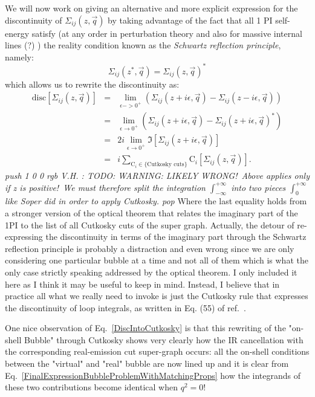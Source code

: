 \documentclass[11pt]{article}
\def\cmtVH#1{\emph{\pdfcolorstack\MyArticleWithColor push {1 0 0 rgb} V.H. : #1 \pdfcolorstack\MyArticleWithColor pop}}
\begin{document}
We will now work on giving an alternative and more explicit expression for the discontinuity of $\Sigma_{ij}(z, \vec{q})$ by taking advantage of the fact that all 1 PI self-energy satisfy (at any order in perturbation theory and also for massive internal lines (?) ) the reality condition known as the \emph{Schwartz reflection principle}, namely:
\begin{equation}
\Sigma_{ij}(z^*, \vec{q})=\Sigma_{ij}(z, \vec{q})^*
\end{equation}
which allows us to rewrite the discontinuity as:
\begin{eqnarray}
\textrm{disc} \left[ \Sigma_{ij}(z, \vec{q}) \right] &=& \lim_{\epsilon->0^+} \left( \Sigma_{ij}(z+i\epsilon, \vec{q}) - \Sigma_{ij}(z-i\epsilon, \vec{q}) \right ) \nonumber \\
&=&  \lim_{\epsilon \rightarrow 0^+} \left( \Sigma_{ij}(z+i\epsilon, \vec{q}) - \Sigma_{ij}(z+i\epsilon, \vec{q})^* \right )\nonumber \\
&=&  2 i \lim_{\epsilon \rightarrow 0^+}  \Im{ \left[ \Sigma_{ij}(z+i\epsilon, \vec{q}) \right] } \nonumber \\
&=&  i \sum_{\textrm{C}_i\in\{\textrm{Cutkosky cuts}\}} \textrm{C}_i\left[ \Sigma_{ij}(z, \vec{q})\right ].\label{DiscIntoCutkosky}
\end{eqnarray}
\cmtVH{TODO: WARNING: LIKELY WRONG!\ Above applies only if z is positive!\ We must therefore split the integration $\int_{-\infty}^{+\infty}$ into two pieces $\int_{0}^{+\infty}$ like Soper did in order to apply Cutkosky.}
Where the last equality holds from a stronger version of the optical theorem that relates the imaginary part of the 1PI to the list of all Cutkosky cuts of the super graph.  
Actually, the detour of re-expressing the discontinuity in terms of the imaginary part through the Schwartz reflection principle is probably a distraction and even wrong since we are only considering one particular bubble at a time and not all of them which is what the only case strictly speaking addressed by the optical theorem.
I only included it here as I think it may be useful to keep in mind.
Instead, I believe that in practice all what we really need to invoke is just the Cutkosky rule that expresses the discontinuity of loop integrals, as written in Eq. (55) of ref.~\cite{Zwicky:2016lka}.

One nice observation of Eq.~\ref{DiscIntoCutkosky} is that this rewriting of the "on-shell Bubble" through Cutkosky shows very clearly how the IR cancellation with the corresponding real-emission cut super-graph occurs: all the on-shell conditions between the "virtual" and "real" bubble are now lined up and it is clear from Eq.~\ref{FinalExpressionBubbleProblemWithMatchingProps} how the integrands of these two contributions become identical when $q^2=0$!
\end{document}
